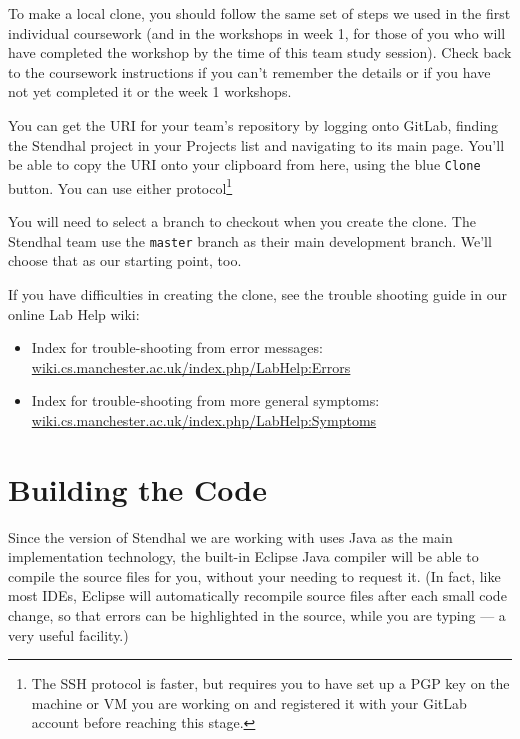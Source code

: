 \documentclass[
]{book}
\providecommand{\tightlist}{%
  \setlength{\itemsep}{0pt}\setlength{\parskip}{0pt}}
\begin{document}
To make a local clone, you should follow the same set of steps we used in the first individual coursework (and in the workshops in week 1, for those of you who will have completed the workshop by the time of this team study session). Check back to the coursework instructions if you can't remember the details or if you have not yet completed it or the week 1 workshops.

You can get the URI for your team's repository by logging onto GitLab, finding the Stendhal project in your Projects list and navigating to its main page. You'll be able to copy the URI onto your clipboard from here, using the blue \texttt{Clone} button. You can use either protocol\footnote{The SSH protocol is faster, but requires you to have set up a PGP key on the machine or VM you are working on and registered it with your GitLab account before reaching this stage.}

You will need to select a branch to checkout when you create the clone. The Stendhal team use the \texttt{master} branch as their main development branch. We'll choose that as our starting point, too.

If you have difficulties in creating the clone, see the trouble shooting guide in our online Lab Help wiki:

\begin{itemize}
\tightlist
\item
  Index for trouble-shooting from error messages: \href{https://wiki.cs.manchester.ac.uk/index.php/LabHelp:Errors}{wiki.cs.manchester.ac.uk/index.php/LabHelp:Errors}
\item
  Index for trouble-shooting from more general symptoms: \href{https://wiki.cs.manchester.ac.uk/index.php/LabHelp:Symptoms}{wiki.cs.manchester.ac.uk/index.php/LabHelp:Symptoms}
\end{itemize}

\hypertarget{bcode}{%
\section{Building the Code}\label{bcode}}

Since the version of Stendhal we are working with uses Java as the main implementation technology, the built-in Eclipse Java compiler will be able to compile the source files for you, without your needing to request it. (In fact, like most IDEs, Eclipse will automatically recompile source files after each small code change, so that errors can be highlighted in the source, while you are typing --- a very useful facility.)
\end{document}
